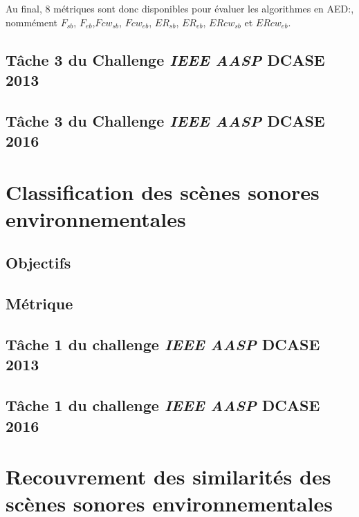 Au final, 8 métriques sont donc disponibles pour évaluer les algorithmes en AED:, nommément $F_{sb}$, $F_{eb}$,$Fcw_{sb}$, $Fcw_{eb}$, $ER_{sb}$, $ER_{eb}$, $ERcw_{sb}$ et $ERcw_{eb}$.

\subsection{Tâche 3 du Challenge \emph{IEEE AASP} DCASE 2013}
\label{sec:ch6_dcase2013AED}

\citep{Giannoulis:2013a,Stowell15}

\subsection{Tâche 3 du Challenge \emph{IEEE AASP} DCASE 2016}
\label{sec:ch6_dcase2016AED}

\section{Classification des scènes sonores environnementales}
\label{sec:ch6_ASC}

\subsection{Objectifs}
\label{sec:ch6_objASC}


\subsection{Métrique}
\label{sec:ch6_metriqueASC}

\subsection{Tâche 1 du challenge \emph{IEEE AASP} DCASE 2013}
\label{sec:ch6_dcase2013ASC}

\subsection{Tâche 1 du challenge \emph{IEEE AASP} DCASE 2016}
\label{sec:ch6_dcase2016ASC}

\section{Recouvrement des similarités des scènes sonores environnementales}
\label{sec:ch6_ASSR}

